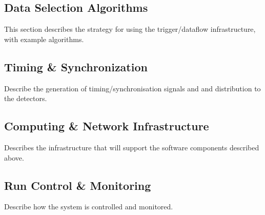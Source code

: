 \subsection{Data Selection Algorithms}
\label{sec:fdsp-daq-hlt}

This section describes the strategy for using the trigger/dataflow infrastructure, with example algorithms.

%
%
%

\subsection{Timing \& Synchronization}
\label{sec:fdsp-daq-hlt}

Describe the generation of timing/synchronisation signals and and distribution to the detectors.


\subsection{Computing \& Network Infrastructure}
\label{sec:fdsp-daq-infra}

Describes the infrastructure that will support the software components described above.

\subsection{Run Control \& Monitoring}
\label{sec:fdsp-daq-tcm}

Describe how the system is controlled and monitored.

